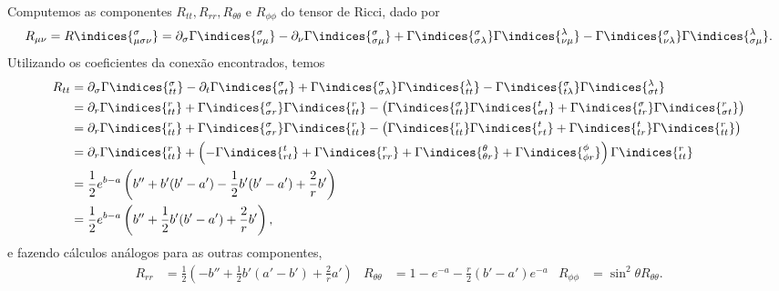 Computemos as componentes \(R_{tt}, R_{rr}, R_{\theta\theta}\) e \(R_{\phi\phi}\) do tensor de Ricci, dado por
\begin{equation*}
    R_{\mu \nu} = R\indices{^\sigma_{\mu \sigma \nu}} = \partial_{\sigma}\Gamma\indices{^{\sigma}_{\nu\mu}}- \partial_{\nu}\Gamma\indices{^{\sigma}_{\sigma\mu}} + \Gamma\indices{^\sigma_{\sigma\lambda}} \Gamma\indices{^\lambda_{\nu\mu}} - \Gamma\indices{^\sigma_{\nu\lambda}} \Gamma\indices{^\lambda_{\sigma\mu}}.
\end{equation*}
Utilizando os coeficientes da conexão encontrados, temos
\begin{align*}
    R_{tt} &= \partial_{\sigma}\Gamma\indices{^{\sigma}_{ t  t }}- \partial_{ t }\Gamma\indices{^{\sigma}_{\sigma t }} + \Gamma\indices{^\sigma_{\sigma\lambda}} \Gamma\indices{^\lambda_{ t  t }} - \Gamma\indices{^\sigma_{ t \lambda}} \Gamma\indices{^\lambda_{\sigma t }}\\
           &= \partial_r \Gamma\indices{^r_{tt}} + \Gamma\indices{^\sigma_{\sigma r}}\Gamma\indices{^r_{tt}} - \left(\Gamma\indices{^\sigma_{tt}}\Gamma\indices{^t_{\sigma t}} + \Gamma\indices{^\sigma_{tr}}\Gamma\indices{^r_{\sigma t}}\right)\\
           &= \partial_r \Gamma\indices{^r_{tt}} + \Gamma\indices{^\sigma_{\sigma r}}\Gamma\indices{^r_{tt}} - \left(\Gamma\indices{^r_{tt}}\Gamma\indices{^t_{r t}} + \Gamma\indices{^t_{tr}}\Gamma\indices{^r_{tt}} \right)\\
           &= \partial_r \Gamma\indices{^r_{tt}} + \left(-\Gamma\indices{^t_{rt}} + \Gamma\indices{^r_{rr}} + \Gamma\indices{^\theta_{\theta r}} + \Gamma\indices{^\phi_{\phi r}}\right)\Gamma\indices{^r_{tt}}\\
           &= \frac12 e^{b-a}\left(b'' + b'(b'-a') - \frac12 b' (b' - a') + \frac2rb'\right)\\
           &= \frac12 e^{b-a}\left(b'' + \frac12b'(b'-a') + \frac2rb'\right),
\end{align*}
e fazendo cálculos análogos para as outras componentes,
\begin{align*}
    R_{rr} &= \frac12\left(-b'' + \frac12b'(a'-b') + \frac2ra'\right) & R_{\theta\theta} &= 1 - e^{-a} - \frac{r}2(b' - a')e^{-a} & R_{\phi\phi} &= \sin^2\theta R_{\theta\theta}.
\end{align*}

